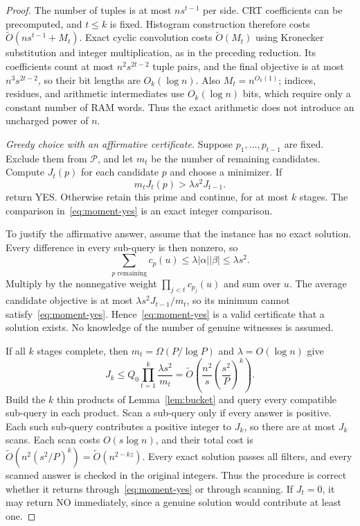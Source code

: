 \documentclass[11pt]{article}
\newcommand{\softO}{\widetilde O}
\begin{document}
\begin{proof}
The number of tuples is at most $n s^{t-1}$ per side. CRT coefficients can
be precomputed, and $t\le k$ is fixed. Histogram construction therefore
costs $\softO(n s^{t-1}+M_t)$. Exact cyclic convolution costs
$\softO(M_t)$ using Kronecker substitution and integer multiplication, as
in the preceding reduction. Its coefficients count at most
$n^2s^{2t-2}$ tuple pairs, and the final objective is at most
$n^3s^{2t-2}$, so their bit lengths are $O_k(\log n)$.
Also $M_t=n^{O_k(1)}$; indices, residues, and arithmetic intermediates use
$O_k(\log n)$ bits, which require only a constant number of RAM words.
Thus the exact arithmetic does not introduce an uncharged power of $n$.

\emph{Greedy choice with an affirmative certificate.} Suppose
$p_1,\ldots,p_{t-1}$ are fixed. Exclude them from $\mathcal P$, and let
$m_t$ be the number of remaining candidates. Compute $J_t(p)$ for each
candidate $p$ and choose a minimizer. If
\begin{equation}
\label{eq:moment-yes}
m_t J_t(p)>\lambda s^2 J_{t-1}.
\end{equation}
return YES. Otherwise retain this prime and continue, for at most $k$ stages.
The comparison in~\eqref{eq:moment-yes} is an exact integer comparison.

To justify the affirmative answer, assume that the instance has no exact
solution. Every difference in every sub-query is then nonzero, so
\[
\sum_{p\text{ remaining}}c_p(u)
\le\lambda |\alpha||\beta|\le\lambda s^2.
\]
Multiply by the nonnegative weight
$\prod_{j<t}c_{p_j}(u)$ and sum over $u$. The average candidate objective
is at most $\lambda s^2 J_{t-1}/m_t$, so its minimum cannot satisfy~\eqref{eq:moment-yes}.
Hence~\eqref{eq:moment-yes} is a valid certificate that a solution exists. No knowledge of
the number of genuine witnesses is assumed.

If all $k$ stages complete, then $m_t=\Omega(P/\log P)$ and
$\lambda=O(\log n)$ give
\[
J_k\le Q_0\prod_{t=1}^k\frac{\lambda s^2}{m_t}
=\softO\left(\frac{n^2}s\left(\frac{s^2}P\right)^k\right).
\]
Build the $k$ thin products of Lemma~\ref{lem:bucket} and query every
compatible sub-query in each product. Scan a sub-query only if every
answer is positive. Each such sub-query contributes a positive integer
to $J_k$, so there are at most $J_k$ scans. Each scan costs
$O(s\log n)$, and their total cost is
$\softO(n^2(s^2/P)^k)=\softO(n^{2-kz})$.
Every exact solution passes all filters, and every scanned answer is
checked in the original integers. Thus the procedure is correct whether
it returns through~\eqref{eq:moment-yes} or through scanning. If $J_t=0$, it may return NO
immediately, since a genuine solution would contribute at least one.


\end{proof}
\end{document}

